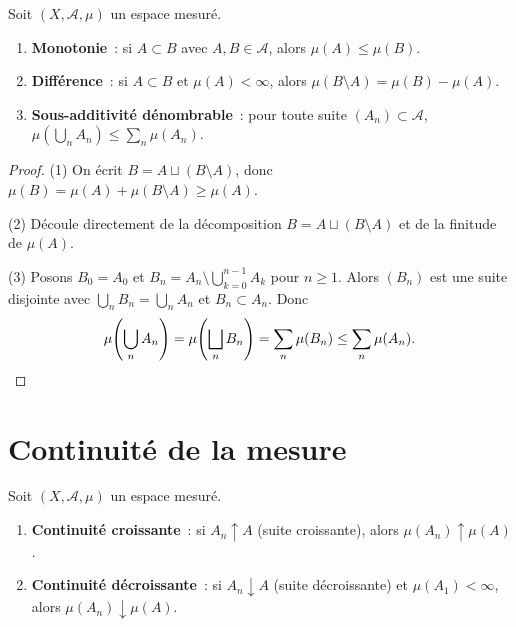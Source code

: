 \begin{proposition}
\label{prop:monotonie}
Soit $(X, \mathcal{A}, \mu)$ un espace mesur\'e.
\begin{enumerate}
    \item \textbf{Monotonie}~: si $A \subset B$ avec $A, B \in \mathcal{A}$, alors
    $\mu(A) \leq \mu(B)$.
    \item \textbf{Diff\'erence}~: si $A \subset B$ et $\mu(A) < \infty$, alors
    $\mu(B \setminus A) = \mu(B) - \mu(A)$.
    \item \textbf{Sous-additivit\'e d\'enombrable}~: pour toute suite
    $(A_n) \subset \mathcal{A}$,
    $\mu\!\left(\bigcup_n A_n\right) \leq \sum_n \mu(A_n)$.
\end{enumerate}
\end{proposition}

\begin{proof}
(1) On \'ecrit $B = A \sqcup (B \setminus A)$, donc
$\mu(B) = \mu(A) + \mu(B \setminus A) \geq \mu(A)$.

(2) D\'ecoule directement de la d\'ecomposition $B = A \sqcup (B \setminus A)$
et de la finitude de $\mu(A)$.

(3) Posons $B_0 = A_0$ et $B_n = A_n \setminus \bigcup_{k=0}^{n-1} A_k$ pour
$n \geq 1$. Alors $(B_n)$ est une suite disjointe avec $\bigcup_n B_n =
\bigcup_n A_n$ et $B_n \subset A_n$. Donc
\[
\mu\!\left(\bigcup_n A_n\right) = \mu\!\left(\bigsqcup_n B_n\right)
= \sum_n \mu(B_n) \leq \sum_n \mu(A_n). \qedhere
\]
\end{proof}

\section{Continuit\'e de la mesure}

\begin{theoreme}
\label{thm:continuite_monotone}
Soit $(X, \mathcal{A}, \mu)$ un espace mesur\'e.
\begin{enumerate}
    \item \textbf{Continuit\'e croissante}~: si $A_n \uparrow A$ (suite croissante),
    alors $\mu(A_n) \uparrow \mu(A)$.
    \item \textbf{Continuit\'e d\'ecroissante}~: si $A_n \downarrow A$ (suite
    d\'ecroissante) et $\mu(A_1) < \infty$, alors $\mu(A_n) \downarrow \mu(A)$.
\end{enumerate}
\end{theoreme}

